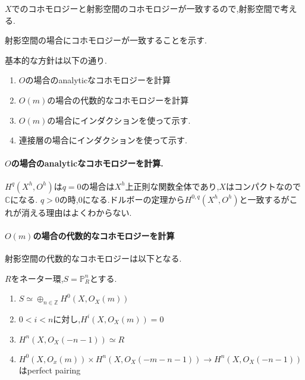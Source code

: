 $X$でのコホモロジーと射影空間のコホモロジーが一致するので,射影空間で考える.

射影空間の場合にコホモロジーが一致することを示す.

基本的な方針は以下の通り.

\begin{enumerate}
  \item $O$の場合のanalyticなコホモロジーを計算
  \item $O(m)$の場合の代数的なコホモロジーを計算
  \item $O(m)$の場合にインダクションを使って示す.
  \item 連接層の場合にインダクションを使って示す.
\end{enumerate}

\paragraph{$O$の場合のanalyticなコホモロジーを計算.}
$H^q(X^h, O^h)$は$q=0$の場合は$X^h$上正則な関数全体であり,$X$はコンパクトなので$\mathbb{C}$になる.
$q>0$の時,0になる.ドルボーの定理から$H^{0,q}(X^h, O^h)$と一致するがこれが消える理由はよくわからない.

\paragraph{$O(m)$の場合の代数的なコホモロジーを計算}
射影空間の代数的なコホモロジーは以下となる.

\begin{thm}
$R$をネーター環,$S=\mathbb{P}_R^n$とする.
  \begin{enumerate}
    \item $S \simeq \oplus_{n \in \mathbb{Z}}H^0(X, O_X(m))$
    \item $0 < i < n$に対し,$H^i(X, O_X(m)) = 0$
    \item $H^n(X, O_X(-n-1)) \simeq R$
    \item $H^0(X, O_x(m)) \times H^n(X, O_X(-m-n-1)) \to H^n(X, O_X(-n-1))$はperfect pairing
  \end{enumerate}
\end{thm}

